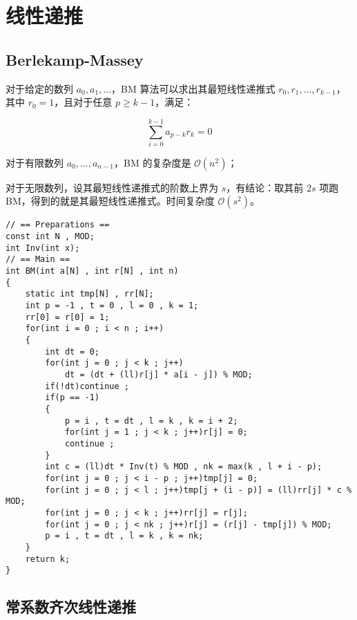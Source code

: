 \section{线性递推}

\subsection{Berlekamp-Massey}

对于给定的数列 $a_0,a_1,\dots$，BM 算法可以求出其最短线性递推式 $r_{0},r_{1},\dots,r_{k-1}$，其中 $r_0=1$，且对于任意 $p\ge k-1$，满足：

$$
\sum\limits_{i=0}^{k-1} a_{p-k}r_{k} = 0
$$

对于有限数列 $a_0,\dots,a_{n-1}$，BM 的复杂度是 $\mathcal{O}(n^2)$；

对于无限数列，设其最短线性递推式的阶数上界为 $s$，有结论：取其前 $2s$ 项跑 BM，得到的就是其最短线性递推式。时间复杂度 $\mathcal{O}(s^2)$。

\begin{verbatim}
// == Preparations ==
const int N , MOD;
int Inv(int x);
// == Main ==
int BM(int a[N] , int r[N] , int n)
{
    static int tmp[N] , rr[N];
    int p = -1 , t = 0 , l = 0 , k = 1; 
    rr[0] = r[0] = 1;
    for(int i = 0 ; i < n ; i++)
    {
        int dt = 0;
        for(int j = 0 ; j < k ; j++)
            dt = (dt + (ll)r[j] * a[i - j]) % MOD;
        if(!dt)continue ;
        if(p == -1)
        {
            p = i , t = dt , l = k , k = i + 2;
            for(int j = 1 ; j < k ; j++)r[j] = 0;
            continue ;
        }
        int c = (ll)dt * Inv(t) % MOD , nk = max(k , l + i - p);
        for(int j = 0 ; j < i - p ; j++)tmp[j] = 0;
        for(int j = 0 ; j < l ; j++)tmp[j + (i - p)] = (ll)rr[j] * c % MOD;
        for(int j = 0 ; j < k ; j++)rr[j] = r[j];
        for(int j = 0 ; j < nk ; j++)r[j] = (r[j] - tmp[j]) % MOD;
        p = i , t = dt , l = k , k = nk;
    }
    return k;
}
\end{verbatim}

\subsection{常系数齐次线性递推}

